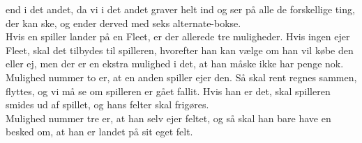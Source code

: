 end i det  andet, da vi i det andet graver helt ind og ser på alle de
forskellige ting, der  kan ske, og ender derved med seks alternate-bokse.\\
\indent Hvis en spiller lander på en Fleet, er der allerede tre muligheder. Hvis
ingen ejer Fleet, skal det tilbydes til spilleren, hvorefter han kan vælge om han vil
købe den eller ej,  men der er en ekstra mulighed i det, at han måske ikke har
penge nok.\\
\indent Mulighed nummer to er, at en anden spiller ejer den. Så skal rent regnes
sammen, flyttes, og vi må se om spilleren er gået fallit. Hvis han er det, skal 
spilleren smides ud af spillet, og hans felter skal frigøres.\\
\indent Mulighed nummer tre er, at han selv ejer feltet, og så skal han bare
have en besked om, at han er landet på sit eget felt.
